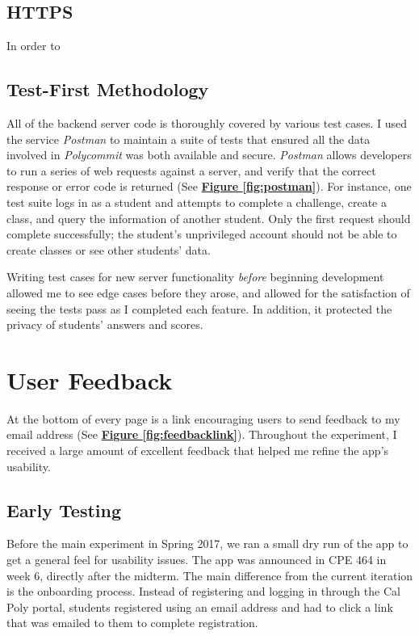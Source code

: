 \subsection{HTTPS}
\par In order to %

\subsection{Test-First Methodology}
\par All of the backend server code is thoroughly covered by various test cases. I used the service \textit{Postman} to maintain a suite of tests that ensured all the data involved in \textit{Polycommit} was both available and secure. \textit{Postman} allows developers to run a series of web requests against a server, and verify that the correct response or error code is returned (See  \textbf{\hyperref[fig:polycommit5]{Figure \ref*{fig:postman}}}). For instance, one test suite logs in as a student and attempts to complete a challenge, create a class, and query the information of another student. Only the first request should complete successfully; the student's unprivileged account should not be able to create classes or see other students' data.

\par Writing test cases for new server functionality \textit{before} beginning development allowed me to see edge cases before they arose, and allowed for the satisfaction of seeing the tests pass as I completed each feature. In addition, it protected the privacy of students' answers and scores.



\section{User Feedback}
\par At the bottom of every page is a link encouraging users to send feedback to my email address (See \textbf{\hyperref[fig:feedbacklink]{Figure \ref*{fig:feedbacklink}}}). Throughout the experiment, I received a large amount of excellent feedback that helped me refine the app's usability.

\subsection{Early Testing}
\par Before the main experiment in Spring 2017, we ran a small dry run of the app to get a general feel for usability issues. The app was announced in CPE 464 in week 6, directly after the midterm. The main difference from the current iteration is the onboarding process. Instead of registering and logging in through the Cal Poly portal, students registered using an email address and had to click a link that was emailed to them to complete registration.

